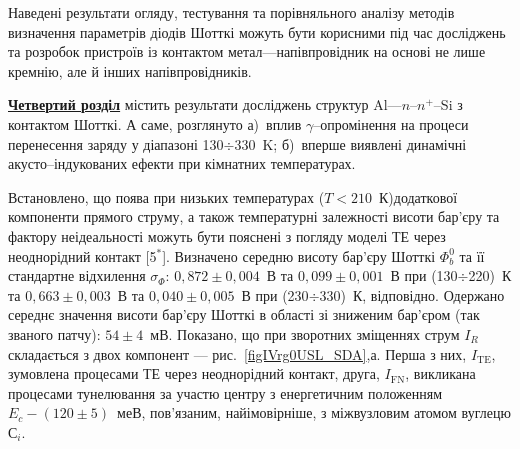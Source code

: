 Наведені результати огляду, тестування та порівняльного аналізу методів визначення параметрів діодів Шотткі можуть бути корисними під час досліджень та розробок пристроїв із контактом метал---напівпровідник на основі не лише кремнію, але й інших напівпровідників.


\underline{\textbf{Четвертий розділ}} містить результати досліджень структур Al---$n$--$n^+$--Si з контактом Шотткі.
А саме, розглянуто
а)~вплив $\gamma$--опромінення на процеси перенесення заряду у діапазоні 130$\div$330~K;
б)~вперше виявлені динамічні акусто--індукованих ефекти при кімнатних температурах.
%

Встановлено, що поява при низьких температурах ($T<210$~К)додаткової компоненти прямого струму,
а також температурні залежності висоти бар'єру та фактору неідеальності можуть бути пояснені
з погляду моделі ТЕ через неоднорідний контакт
[5$^*$].
%
       Визначено середню висоту бар'єру Шотткі $\Phi_b^0$ та її стандартне відхилення $\sigma_{\Phi}$:
       $0,872\pm0,004$~В та $0,099\pm0,001$~В при (130$\div$220)~К та
       $0,663\pm0,003$~В та $0,040\pm0,005$~В при (230$\div$330)~К, відповідно.
Одержано середнє значення висоти бар'єру Шотткі в області зі зниженим бар'єром (так званого патчу): $54\pm4$~мВ.
Показано, що при зворотних зміщеннях струм $I_R$ складається з двох компонент --- рис.~\ref{figIVrg0USL_SDA},а.
Перша з них, $I_\mathrm{TE}$, зумовлена процесами ТЕ через неоднорідний контакт,
друга,
$I_\mathrm{FN}$, викликана процесами тунелювання за участю
центру з енергетичним положенням $E_c-(120\pm5)$~меВ, пов'язаним, найімовірніше, з міжвузловим атомом вуглецю С$_i$.

